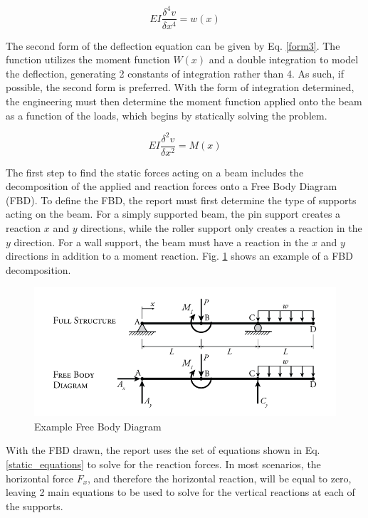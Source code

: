 \documentclass[a4paper]{article}
\begin{document}
\begin{equation}
    EI \frac{\delta^4 v}{\delta x^4} = w(x)
\label{form1}
\end{equation}

The second form of the deflection equation can be given by Eq. \ref{form3}. The function utilizes the moment function $W(x)$ and a double integration to model the deflection, generating 2 constants of integration rather than 4. As such, if possible, the second form is preferred. With the form of integration determined, the engineering must then determine the moment function applied onto the beam as a function of the loads, which begins by statically solving the problem.

\begin{equation}
    EI \frac{\delta^2 v}{\delta x^2} = M(x)
\label{form3}
\end{equation}

The first step to find the static forces acting on a beam includes the decomposition of the applied and reaction forces onto a Free Body Diagram (FBD). To define the FBD, the report must first determine the type of supports acting on the beam. For a simply supported beam, the pin support creates a reaction $x$ and $y$ directions, while the roller support only creates a reaction in the $y$ direction. For a wall support, the beam must have a reaction in the $x$ and $y$ directions in addition to a moment reaction. Fig. \ref{FBD_example} shows an example of a FBD decomposition.

\begin{figure}[h]
\includegraphics[width=\textwidth]{FBD/FBD_example.jpeg}
\caption{Example Free Body Diagram}
\label{FBD_example}
\end{figure}

With the FBD drawn, the report uses the set of equations shown in Eq. \ref{static_equations} to solve for the reaction forces. In most scenarios, the horizontal force $F_x$, and therefore the horizontal reaction, will be equal to zero, leaving 2 main equations to be used to solve for the vertical reactions at each of the supports. 
\end{document}
